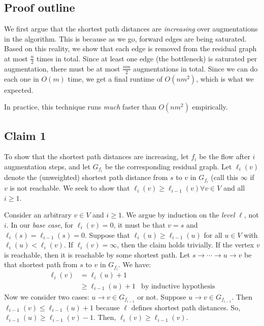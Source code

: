 \documentclass[titlepage, 12pt, leqno]{article}
\begin{document}
\subsection{Proof outline}
We first argue that the shortest path distances are \textit{increasing} over
augmentations in the algorithm. This is because as we go, forward edges are
being saturated. Based on this reality, we show that each edge is removed from 
the residual graph at most $\frac{n}{2}$ times in total. Since at least one
edge (the bottleneck) is saturated per augmentation, there must be at most
$\frac{nm}{2}$ augmentations in total. Since we can do each one in $O(m)$ time,
we get a final runtime of $O(nm^{2})$, which is what we expected. 
\begin{note}
    In practice, this technique runs \textit{much} faster than $O(nm^{2})$
    empirically.
\end{note}

\subsection{Claim 1}

To show that the shortest path distances are increasing, let $f_{i}$ be the flow
after $i$ augmentation steps, and let $G_{f_{i}}$ be the corresponding residual
graph. Let $\ell_{i}(v)$ denote the (unweighted) shortest path distance from
$s$ to $v$ in $G_{f_{i}}$ (call this $\infty$ if $v$ is not reachable. We seek
to show that $\ell_{i}(v) \ge \ell_{i-1}(v) \forall v \in V$ and all $i \ge 1$.

Consider an arbitrary $v \in V$ and $i \ge 1$. We argue by induction on the
\textit{level} $\ell$, not $i$. In our \textit{base case}, for $\ell_{i}(v)=0$,
it must be that $v=s$ and $\ell_{i}(s) = \ell_{i-1}(s)=0$. Suppose that
$\ell_{i}(u) \ge \ell_{i-1}(u)$ for all $u \in V$ with $\ell_{i}(u) < 
\ell_{i}(v)$. If $\ell_{i}(v) = \infty$, then the claim holds trivially. If
the vertex $v$ is reachable, then it is reachable by some shortest path. Let 
$s \rightarrow \cdots \rightarrow u \rightarrow v$ be that shortest path from
$s$ to $v$ in $G_{f_{i}}$. We have:
\begin{align*}
    \ell_{i}(v) &= \ell_{i}(u) + 1\\
                &\ge \ell_{i-1}(u) + 1 & \text{by inductive hypothesis}
\end{align*}
Now we consider two cases: $u \rightarrow v \in G_{f_{i-1}}$ or not. Suppose
$u \rightarrow v \in  G_{f_{i-1}}$. Then $\ell_{i-1}(v) \le \ell_{i-1}(u)+1$
because $\ell$ defines shortest path distances. So, $\ell_{i-1}(u) \ge
\ell_{i-1}(v) - 1$. Then, $\ell_{i}(v) \ge \ell_{i-1}(v)$.
\end{document}

